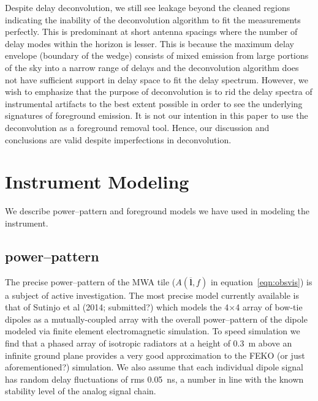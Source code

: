\documentclass[preprint2,iop,numberedappendix]{emulateapj}
\begin{document}
Despite delay deconvolution, we still see leakage beyond the cleaned regions indicating the inability of the deconvolution algorithm to fit the measurements perfectly. This is predominant at short antenna spacings where the number of delay modes within the horizon is lesser. This is because the maximum delay envelope (boundary of the wedge) consists of mixed emission from large portions of the sky into a narrow range of delays and the deconvolution algorithm does not have sufficient support in delay space to fit the delay spectrum. However, we wish to emphasize that the purpose of deconvolution is to rid the delay spectra of instrumental artifacts to the best extent possible in order to see the underlying signatures of foreground emission. It is not our intention in this paper to use the deconvolution as a foreground removal tool. Hence, our discussion and conclusions are valid despite imperfections in deconvolution.

\section{Instrument Modeling}\label{sec:modeling}

We describe power--pattern and foreground models we have used in modeling the instrument. %

\subsection{power--pattern}\label{sec:power_pattern}

The precise power--pattern of the MWA tile ($A(\overline{\mathbf{l}},f)$ in equation~\ref{eqn:obsvis}) is a subject of active investigation. The most precise model currently available is that of Sutinjo et al (2014; submitted?) which models the 4$\times$4 array of bow-tie dipoles as a mutually-coupled array with the overall power--pattern of the dipole modeled via finite element electromagnetic simulation. To speed simulation we find that a phased array of isotropic radiators at a height of 0.3~m above an infinite ground plane provides a very good approximation to the FEKO (or just aforementioned?) simulation. We also assume that each individual dipole signal has random delay fluctuations of rms 0.05~ns, a number in line with the known stability level of the analog signal chain.
\end{document}
